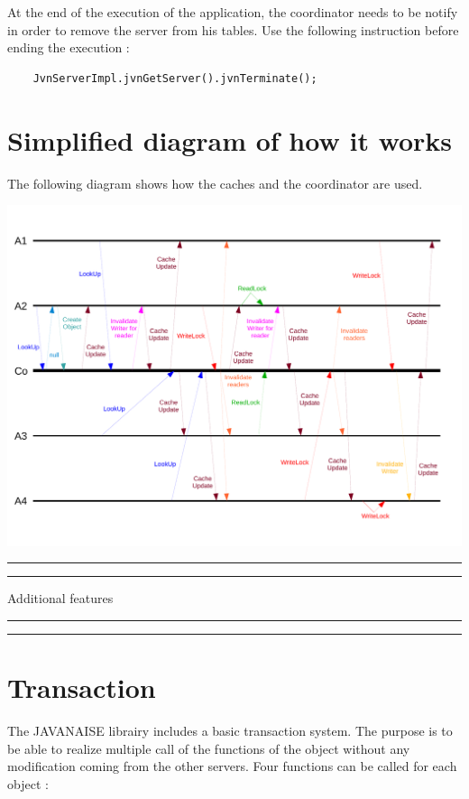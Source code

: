 \documentclass{article}
\begin{document}
At the end of the execution of the application, the coordinator needs to be notify in order to remove the server from his tables. Use the following instruction before ending the execution : \\

\noindent
\begin{verbatim}
    JvnServerImpl.jvnGetServer().jvnTerminate();
\end{verbatim}

\section{Simplified diagram of how it works}

The following diagram shows how the caches and the coordinator are used.

\begin{center}
\includegraphics[width=16.85cm, clip, trim=0.4cm 1.5cm 0.6cm 2cm]{sch1}
\end{center}

\hrule\hrule \vspace{5mm}
\begin{huge}Additional features
\end{huge}
\vspace{5mm} \hrule\hrule

\section{Transaction}

The JAVANAISE librairy includes a basic transaction system. The purpose is to be able to realize multiple call of the functions of the object without any modification coming from the other servers. Four functions can be called for each object :
\end{document}
